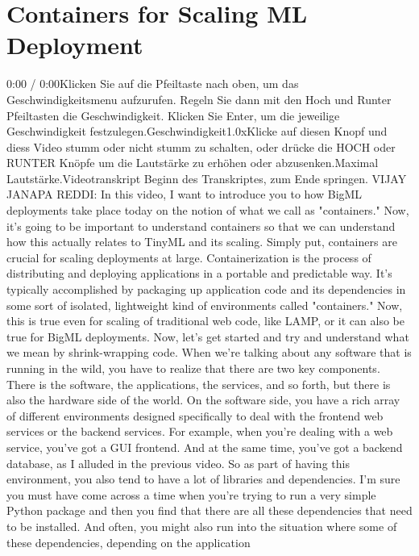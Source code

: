 {{{{{\section{Containers for Scaling ML Deployment}

    0:00 / 0:00Klicken Sie auf die Pfeiltaste nach oben, um das Geschwindigkeitsmenu aufzurufen. Regeln Sie dann mit den Hoch und Runter Pfeiltasten die Geschwindigkeit. Klicken Sie Enter, um die jeweilige Geschwindigkeit festzulegen.Geschwindigkeit1.0xKlicke auf diesen Knopf und diess Video stumm oder nicht stumm zu schalten, oder drücke die HOCH oder RUNTER Knöpfe um die Lautstärke zu erhöhen oder abzusenken.Maximal Lautstärke.Videotranskript
    Beginn des Transkriptes, zum Ende springen.
    VIJAY JANAPA REDDI: In this video, I want
    to introduce you to how BigML deployments take place today
    on the notion of what we call as "containers."
    Now, it's going to be important to understand containers
    so that we can understand how this actually
    relates to TinyML and its scaling.
    Simply put, containers are crucial for scaling deployments at large.
    Containerization is the process of distributing and deploying applications
    in a portable and predictable way.
    It's typically accomplished by packaging up
    application code and its dependencies in some sort of isolated, lightweight kind
    of environments called "containers."
    Now, this is true even for scaling of traditional web code, like LAMP,
    or it can also be true for BigML deployments.
    Now, let's get started and try and understand
    what we mean by shrink-wrapping code.
    When we're talking about any software that is running in the wild,
    you have to realize that there are two key components.
    There is the software, the applications, the services, and so forth,
    but there is also the hardware side of the world.
    On the software side, you have a rich array
    of different environments designed specifically
    to deal with the frontend web services or the backend services.
    For example, when you're dealing with a web service, you've got a GUI frontend.
    And at the same time, you've got a backend database,
    as I alluded in the previous video.
    So as part of having this environment, you also
    tend to have a lot of libraries and dependencies.
    I'm sure you must have come across a time when you're
    trying to run a very simple Python package
    and then you find that there are all these dependencies that
    need to be installed.
    And often, you might also run into the situation
    where some of these dependencies, depending on the application
}}}}}
